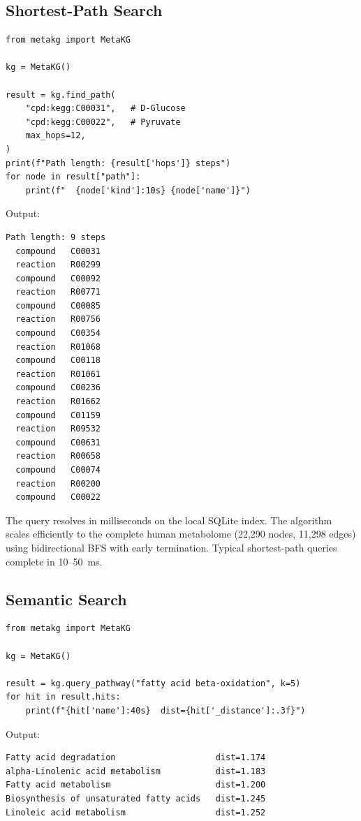 \documentclass[10pt]{article}
\begin{document}
\subsection{Shortest-Path Search}

\begin{lstlisting}[style=python, caption={Finding the shortest metabolic route between two compounds.}]
from metakg import MetaKG

kg = MetaKG()

result = kg.find_path(
    "cpd:kegg:C00031",   # D-Glucose
    "cpd:kegg:C00022",   # Pyruvate
    max_hops=12,
)
print(f"Path length: {result['hops']} steps")
for node in result["path"]:
    print(f"  {node['kind']:10s} {node['name']}")
\end{lstlisting}

Output:
\begin{lstlisting}[style=bash, caption={}]
Path length: 9 steps
  compound   C00031
  reaction   R00299
  compound   C00092
  reaction   R00771
  compound   C00085
  reaction   R00756
  compound   C00354
  reaction   R01068
  compound   C00118
  reaction   R01061
  compound   C00236
  reaction   R01662
  compound   C01159
  reaction   R09532
  compound   C00631
  reaction   R00658
  compound   C00074
  reaction   R00200
  compound   C00022
\end{lstlisting}

The query resolves in milliseconds on the local SQLite index. The algorithm
scales efficiently to the complete human metabolome (22,290 nodes, 11,298
edges) using bidirectional BFS with early termination. Typical shortest-path
queries complete in 10--50~ms.

\subsection{Semantic Search}

\begin{lstlisting}[style=python, caption={Semantic pathway retrieval.}]
from metakg import MetaKG

kg = MetaKG()

result = kg.query_pathway("fatty acid beta-oxidation", k=5)
for hit in result.hits:
    print(f"{hit['name']:40s}  dist={hit['_distance']:.3f}")
\end{lstlisting}

Output:
\begin{lstlisting}[style=bash, caption={}]
Fatty acid degradation                    dist=1.174
alpha-Linolenic acid metabolism           dist=1.183
Fatty acid metabolism                     dist=1.200
Biosynthesis of unsaturated fatty acids   dist=1.245
Linoleic acid metabolism                  dist=1.252
\end{lstlisting}
\end{document}
